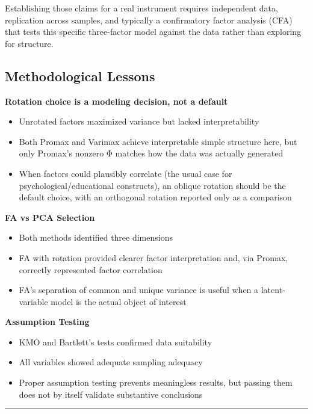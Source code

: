 \documentclass[
]{article}
\begin{document}
Establishing those claims for a real instrument requires independent
data, replication across samples, and typically a confirmatory factor
analysis (CFA) that tests this specific three-factor model against the
data rather than exploring for structure.

\subsection{Methodological Lessons}

\textbf{Rotation choice is a modeling decision, not a default}

\begin{itemize}
\item
  Unrotated factors maximized variance but lacked interpretability
\item
  Both Promax and Varimax achieve interpretable simple structure here,
  but only Promax's nonzero Φ matches how the data was actually
  generated
\item
  When factors could plausibly correlate (the usual case for
  psychological/educational constructs), an oblique rotation should be
  the default choice, with an orthogonal rotation reported only as a
  comparison
\end{itemize}

\textbf{FA vs PCA Selection}

\begin{itemize}
\item
  Both methods identified three dimensions
\item
  FA with rotation provided clearer factor interpretation and, via
  Promax, correctly represented factor correlation
\item
  FA's separation of common and unique variance is useful when a
  latent-variable model is the actual object of interest
\end{itemize}

\textbf{Assumption Testing}

\begin{itemize}
\item
  KMO and Bartlett's tests confirmed data suitability
\item
  All variables showed adequate sampling adequacy
\item
  Proper assumption testing prevents meaningless results, but passing
  them does not by itself validate substantive conclusions
\end{itemize}

\begin{center}\rule{0.5\linewidth}{0.5pt}\end{center}
\end{document}
